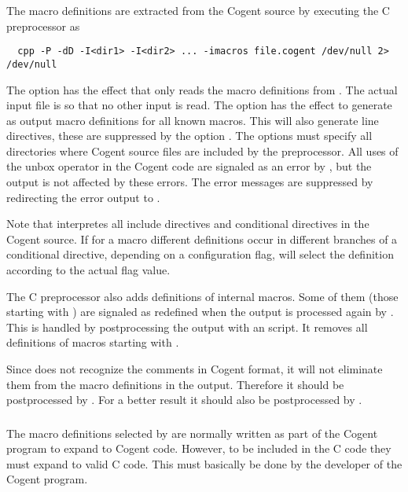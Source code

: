 The macro definitions are extracted from the Cogent source  by executing the C preprocessor as
\begin{verbatim}
  cpp -P -dD -I<dir1> -I<dir2> ... -imacros file.cogent /dev/null 2> /dev/null
\end{verbatim}
The option  has the effect that  only reads the macro definitions from .
The actual input file is  so that no other input is read. The option  has the effect
to generate as output macro definitions for all known macros. This will also generate line directives, these are
suppressed by the option . The  options must specify all directories where Cogent source files
are included by the preprocessor. All uses of the unbox operator \code{\#} in the Cogent code are signaled as an 
error by , but the output is not affected by these errors. The error messages are suppressed by redirecting
the error output to .

Note that  interpretes all include directives and conditional directives in the Cogent source. If for a macro
different definitions occur in different branches of a conditional directive, depending on a configuration flag,
 will select the definition according to the actual flag value.

The C preprocessor also adds definitions of internal macros. Some of them (those starting with ) are 
signaled as redefined when the output is processed again by . This is handled
by postprocessing the output with an  script. It removes all definitions of macros starting with .

Since  does not recognize the comments in Cogent format, it will not eliminate them from the macro definitions 
in the output. Therefore it should be postprocessed by . For a better result it should also 
be postprocessed by .

\subsubsection{}

The macro definitions selected by  are normally written as part of the Cogent program to expand 
to Cogent code. However, to be included in the C code they must expand to valid C code. This must basically be done
by the developer of the Cogent program. 

